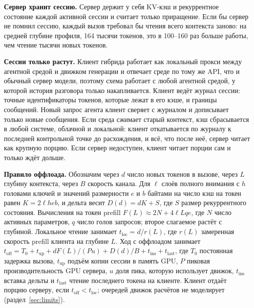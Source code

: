 \textbf{Сервер хранит сессию.} Сервер держит у себя KV-кэш и рекуррентное состояние каждой активной сессии и считает
только приращение. Если бы сервер не помнил сессию, каждый вызов требовал бы чтения всего контекста заново: на средней
глубине профиля, 164 тысячи токенов, это в 100--160 раз больше работы, чем чтение тысячи новых токенов.

\textbf{Сессии только растут.} Клиент гибрида работает как локальный прокси между агентной средой и движком
генерации и отвечает среде по тому же API, что и обычный сервер модели, поэтому схема работает с любой агентной
средой, у которой история разговора только накапливается. Клиент ведёт журнал сессии: точные идентификаторы токенов,
которые лежат в его кэше, и границы сообщений. Новый запрос агента клиент сверяет с журналом и дописывает только новые
сообщения. Если среда сжимает старый контекст, кэш сбрасывается в любой системе, облачной и локальной: клиент
откатывается по журналу к последней контрольной точке до расхождения, и всё, что после неё, сервер читает как крупную
порцию. Если сервер недоступен, клиент читает порции сам и только ждёт дольше.

\textbf{Правило оффлоада.} Обозначим через $d$ число новых токенов в вызове, через $L$ глубину контекста, через $B$
скорость канала. Для $\ell$ слоёв полного внимания с $h$ головами ключей и значений размерности $e$ и $b$ байтами на
число кэш на токен равен $K = 2 \ell h e b$, и дельта весит $D(d) = d K + S$, где $S$ размер рекуррентного состояния.
Вычисления на токен prefill $F(L) \approx 2N + 4 \ell L q e$, где $N$ число активных параметров, $q$ число голов
запросов; второе слагаемое растёт с глубиной. Локальное чтение занимает $t_{\text{loc}} = d / r(L)$, где $r(L)$
замеренная скорость prefill клиента на глубине $L$. Ход с оффлоадом занимает $t_{\text{off}} = T_0 + t_{\text{up}} +
d F(L) / (P u) + D(d) / B + t_{\text{ins}} + t_{\text{last}}$, где $T_0$ постоянная задержка вызова, $t_{\text{up}}$
подъём копии сессии в память GPU, $P$ пиковая производительность GPU сервера, $u$ доля пика, которую использует
движок, $t_{\text{ins}}$ вставка дельты и $t_{\text{last}}$ чтение последнего токена на клиенте. Клиент отдаёт порцию
серверу, если $t_{\text{off}} < t_{\text{loc}}$; очередей движок расчётов не моделирует (раздел~\ref{sec:limits}).
